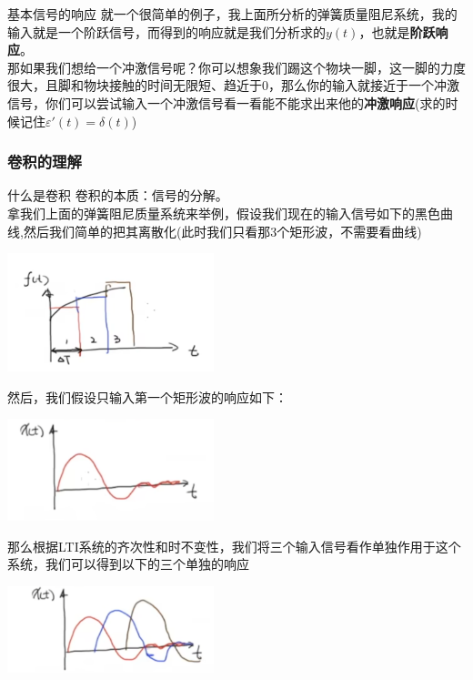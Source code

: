 \documentclass[UTF8,a4paper,12pt]{ctexart}
\begin{document}
  \begin{flushleft}
    \begin{titlebox}{基本信号的响应}
      就一个很简单的例子，我上面所分析的弹簧质量阻尼系统，我的输入就是一个阶跃信号，而得到的响应就是我们分析求的$y(t)$，也就是\textbf{阶跃响应}。\\
      那如果我们想给一个冲激信号呢？你可以想象我们踢这个物块一脚，这一脚的力度很大，且脚和物块接触的时间无限短、趋近于0，那么你的输入就接近于一个冲激信号，你们可以尝试输入一个冲激信号看一看能不能求出来他的\textbf{冲激响应}(求的时候记住$\varepsilon'(t)= \delta \left( t \right)$)
    \end{titlebox}
    \subsubsection{卷积的理解}
    \begin{titlebox}{什么是卷积}
      卷积的本质：信号的分解。\\
      拿我们上面的弹簧阻尼质量系统来举例，假设我们现在的输入信号如下的黑色曲线,然后我们简单的把其离散化(此时我们只看那3个矩形波，不需要看曲线)
      \begin{center}
        \par \includegraphics[width=6cm]{picture/juanji_1.png}
      \end{center}
      然后，我们假设只输入第一个矩形波的响应如下：
      \begin{center}
        \par \includegraphics[width=6cm]{picture/juanji_2.png}
      \end{center}
      那么根据LTI系统的齐次性和时不变性，我们将三个输入信号看作单独作用于这个系统，我们可以得到以下的三个单独的响应
      \begin{center}
        \par \includegraphics[width=6cm]{picture/juanji_3.png}

\end{center}
\end{titlebox}
\end{flushleft}
\end{document}
